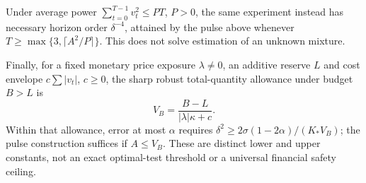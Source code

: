 \begin{theorem}
Under average power $\sum_{t=0}^{T-1}v_t^2\le PT$, $P>0$, the same experiment instead has necessary horizon order $\delta^{-4}$, attained by the pulse above whenever $T\ge\max\{3,\lceil A^2/P\rceil\}$. This does not solve estimation of an unknown mixture.

Finally, for a fixed monetary price exposure $\lambda\ne0$, an additive reserve $L$ and cost envelope $c\sum|v_t|$, $c\ge0$, the sharp robust total-quantity allowance under budget $B>L$ is
\begin{equation}
V_B=\frac{B-L}{|\lambda|\kappa+c}.
\label{eq:financial_resolution}
\end{equation}
Within that allowance, error at most $\alpha$ requires
$\delta^2\ge2\sigma(1-2\alpha)/(K_*V_B)$; the pulse construction suffices if $A\le V_B$. These are distinct lower and upper constants, not an exact optimal-test threshold or a universal financial safety ceiling.
\end{theorem}

